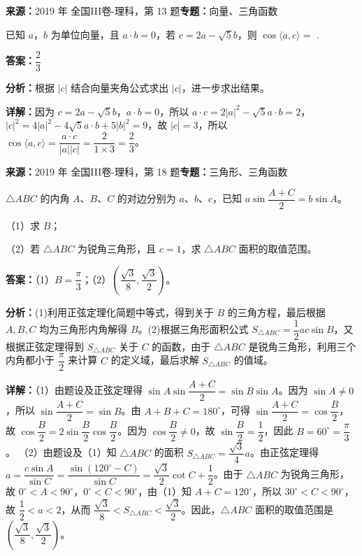 \begin{question}[points=5]
\textbf{来源：}2019 年 全国III卷-理科，第 13 题\quad \textbf{专题：}向量、三角函数\par
已知 $a$，$b$ 为单位向量，且 $a\cdot b=0$，若 $c = 2a - \sqrt{5}b$，则 $\cos\langle a,c\rangle =$ .
\fillin[{$\dfrac{2}{3}$}]
\begin{solution}
\textbf{答案：}$\dfrac{2}{3}$

\textbf{分析：}根据 $|c|$ 结合向量夹角公式求出 $|c|$，进一步求出结果。

\textbf{详解：}因为 $c = 2a - \sqrt{5}b$，$a\cdot b=0$，所以 $a\cdot c = 2|a|^2 - \sqrt{5}a\cdot b = 2$，$|c|^2 = 4|a|^2 -4\sqrt{5}a\cdot b + 5|b|^2 = 9$，故 $|c|=3$，所以 $\cos\langle a,c\rangle = \dfrac{a\cdot c}{|a||c|} = \dfrac{2}{1\times 3} = \dfrac{2}{3}$。
\end{solution}
\end{question}

\begin{question}[points=12]
\textbf{来源：}2019 年 全国III卷-理科，第 18 题\quad \textbf{专题：}三角形、三角函数\par
$\triangle ABC$ 的内角 $A$、$B$、$C$ 的对边分别为 $a$、$b$、$c$，已知 $a\sin\dfrac{A+C}{2} = b\sin A$。

（1）求 $B$；

（2）若 $\triangle ABC$ 为锐角三角形，且 $c=1$，求 $\triangle ABC$ 面积的取值范围。
\begin{solution}
\textbf{答案：}（1）$B = \dfrac{\pi}{3}$；（2）$\left(\dfrac{\sqrt{3}}{8},\dfrac{\sqrt{3}}{2}\right)$。

\textbf{分析：}(1)利用正弦定理化简题中等式，得到关于 $B$ 的三角方程，最后根据 $A,B,C$ 均为三角形内角解得 $B$。(2)根据三角形面积公式 $S_{\triangle ABC} = \dfrac{1}{2}ac\sin B$，又根据正弦定理得到 $S_{\triangle ABC}$ 关于 $C$ 的函数，由于 $\triangle ABC$ 是锐角三角形，利用三个内角都小于 $\dfrac{\pi}{2}$ 来计算 $C$ 的定义域，最后求解 $S_{\triangle ABC}$ 的值域。

\textbf{详解：}（1）由题设及正弦定理得 $\sin A\sin\dfrac{A+C}{2} = \sin B\sin A$。因为 $\sin A\neq 0$，所以 $\sin\dfrac{A+C}{2} = \sin B$。由 $A+B+C=180^\circ$，可得 $\sin\dfrac{A+C}{2} = \cos\dfrac{B}{2}$，故 $\cos\dfrac{B}{2} = 2\sin\dfrac{B}{2}\cos\dfrac{B}{2}$。因为 $\cos\dfrac{B}{2}\neq 0$，故 $\sin\dfrac{B}{2} = \dfrac{1}{2}$，因此 $B=60^\circ = \dfrac{\pi}{3}$。
（2）由题设及（1）知 $\triangle ABC$ 的面积 $S_{\triangle ABC} = \dfrac{\sqrt{3}}{4}a$。由正弦定理得 $a = \dfrac{c\sin A}{\sin C} = \dfrac{\sin(120^\circ - C)}{\sin C} = \dfrac{\sqrt{3}}{2}\cot C + \dfrac{1}{2}$。由于 $\triangle ABC$ 为锐角三角形，故 $0^\circ < A < 90^\circ$，$0^\circ < C < 90^\circ$，由（1）知 $A+C=120^\circ$，所以 $30^\circ < C < 90^\circ$，故 $\dfrac{1}{2} < a < 2$，从而 $\dfrac{\sqrt{3}}{8} < S_{\triangle ABC} < \dfrac{\sqrt{3}}{2}$。因此，$\triangle ABC$ 面积的取值范围是 $\left(\dfrac{\sqrt{3}}{8},\dfrac{\sqrt{3}}{2}\right)$。
\end{solution}
\end{question}

